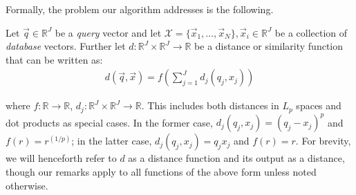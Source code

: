 \begin{table*}[t]
\begin{tabularx}{\linewidth}{X|YYYY}
\bottomrule
\end{tabularx}
\end{table*}

Formally, the problem our algorithm addresses is the following.

Let $\vec{q} \in \mathbb{R}^J$ be a \textit{query} vector and let $\mathcal{X} = \{\vec{x}_1,\ldots,\vec{x}_N\}, \vec{x}_i \in \mathbb{R}^J$ be a collection of \textit{database} vectors. Further let $d: \mathbb{R}^J \times \mathbb{R}^J \rightarrow \mathbb{R}$ be a distance or similarity function that can be written as:
\begin{align}
        d(\vec{q}, \vec{x}) = f(\sum_{j=1}^J d_j(q_j, x_j))
\end{align}


where $f: \mathbb{R} \rightarrow \mathbb{R}$, $d_j: \mathbb{R}^J \times \mathbb{R}^J \rightarrow \mathbb{R}$. This includes both distances in $L_p$ spaces and dot products as special cases. In the former case, $d_j(q_j, x_j) = (q_j - x_j)^p$ and $f(r) = r^{(1/p)}$; in the latter case, $d_j(q_j, x_j) = q_j x_j$ and $f(r) = r$. For brevity, we will henceforth refer to $d$ as a distance function and its output as a distance, though our remarks apply to all functions of the above form unless noted otherwise.

